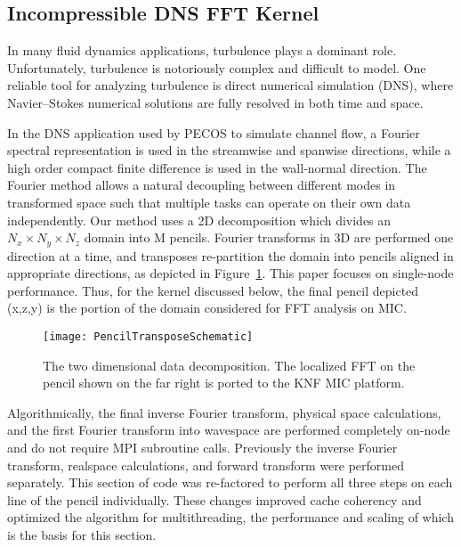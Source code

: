 \subsection{Incompressible DNS FFT Kernel}
\label{sec:dns}

In many fluid dynamics applications, turbulence plays a
dominant role. Unfortunately, turbulence is notoriously complex and
difficult to model.  One reliable tool for analyzing turbulence is
direct numerical simulation (DNS)\cite{jimenez:2007}, where
Navier--Stokes numerical solutions are fully resolved in both time and space. 

In the DNS application used
by PECOS to simulate channel flow, a Fourier spectral
representation is used in the streamwise and spanwise directions,
while a high order compact finite difference is used in the
wall-normal direction\cite{KMM:87,Lele:92}.
The Fourier method allows a natural decoupling between different modes
in transformed space such that multiple tasks can operate on their own data
independently. Our method uses a 2D decomposition which divides an $N_x
\times N_y \times N_z$ domain into M pencils. Fourier transforms in 3D
are performed one direction at a time, and transposes 
re-partition the domain into pencils aligned in appropriate
directions,
as depicted in Figure~\ref{fig:pencil2}. This
paper focuses on single-node performance.  Thus,
for the kernel discussed below, the final pencil depicted (x,z,y) is
the portion of the domain considered for FFT analysis on MIC.

\begin{figure}
 \begin{center}
  \texttt{[image: PencilTransposeSchematic]}
  \caption{The two dimensional data decomposition. The localized FFT
    on the pencil shown on the far right is ported to the KNF MIC platform.}
    \label{fig:pencil2}
 \end{center}
\end{figure}

Algorithmically, the final inverse Fourier transform, physical space
calculations, and the first Fourier transform into wavespace are
performed completely on-node and do not require MPI subroutine calls. 
Previously the inverse Fourier transform, realspace calculations,
and forward transform were performed separately. This section of code
was re-factored to perform all three steps on each line of the pencil
individually. These changes improved cache coherency and optimized the
algorithm for multithreading, the performance and scaling of which is
the basis for this section. 

